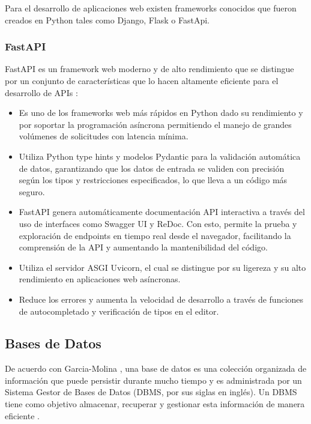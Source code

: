 Para el desarrollo de aplicaciones web existen frameworks conocidos que fueron creados en Python tales como Django, Flask o FastApi.

\subsubsection{FastAPI}
FastAPI es un framework web moderno y de alto rendimiento que se distingue por un conjunto de características que lo hacen altamente eficiente para el desarrollo de APIs \cite{lubanovic2023fastapi}:

\begin{itemize} 
    \item Es uno de los frameworks web más rápidos en Python dado su rendimiento y por soportar la programación asíncrona permitiendo el manejo de grandes volúmenes de solicitudes con latencia mínima.
    \item Utiliza Python type hints y modelos Pydantic para la validación automática de datos, garantizando que los datos de entrada se validen con precisión según los tipos y restricciones especificados, lo que lleva a un código más seguro.
    \item FastAPI genera automáticamente documentación API interactiva a través del uso de interfaces como Swagger UI y ReDoc. Con esto, permite la prueba y exploración de endpoints en tiempo real desde el navegador, facilitando la comprensión de la API y aumentando la mantenibilidad del código.
    \item Utiliza el servidor ASGI Uvicorn, el cual se distingue por su ligereza y su alto rendimiento en aplicaciones web asíncronas.
    \item Reduce los errores y aumenta la velocidad de desarrollo a través de funciones de autocompletado y verificación de tipos en el editor.
\end{itemize}

\subsection{Bases de Datos}
De acuerdo con Garcia-Molina \cite{garcia2008database},  una base de datos es una colección organizada de información que puede persistir durante mucho tiempo y es administrada por un Sistema Gestor de Bases de Datos (DBMS, por sus siglas en inglés).  Un DBMS tiene como objetivo almacenar, recuperar y gestionar esta información de manera eficiente \cite{silberschatz2011database}. 

